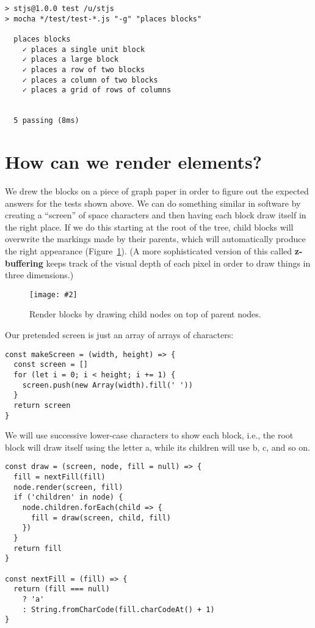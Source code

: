 \documentclass[krantzl]{krantz}
\newcommand{\figpdf}[4]{\begin{figure}%
\centering%
\texttt{[image: \#2]}%
\caption{#3}%
\label{#1}%
\end{figure}}
\newcommand{\figref}[1]{Figure~\ref{#1}}
\newcommand{\glossref}[1]{\textbf{#1}}
\begin{document}
\begin{lstlisting}[frame=tblr,backgroundcolor=\color{black!5}]
> stjs@1.0.0 test /u/stjs
> mocha */test/test-*.js "-g" "places blocks"

  places blocks
    ✓ places a single unit block
    ✓ places a large block
    ✓ places a row of two blocks
    ✓ places a column of two blocks
    ✓ places a grid of rows of columns


  5 passing (8ms)
\end{lstlisting}


\section{How can we render elements?}\label{layout-engine-render}


We drew the blocks on a piece of graph paper
in order to figure out the expected answers for the tests shown above.
We can do something similar in software by creating a “screen” of space characters
and then having each block draw itself in the right place.
If we do this starting at the root of the tree,
child blocks will overwrite the markings made by their parents,
which will automatically produce the right appearance
(\figref{layout-engine-draw-over}).
(A more sophisticated version of this called \glossref{z-buffering}
keeps track of the visual depth of each pixel
in order to draw things in three dimensions.)

\figpdf{layout-engine-draw-over}{./layout-engine/draw-over.pdf}{Render blocks by drawing child nodes on top of parent nodes.}{0.6}


Our pretended screen is just an array of arrays of characters:


\begin{lstlisting}[frame=tblr]
const makeScreen = (width, height) => {
  const screen = []
  for (let i = 0; i < height; i += 1) {
    screen.push(new Array(width).fill(' '))
  }
  return screen
}
\end{lstlisting}



We will use successive lower-case characters to show each block,
i.e.,
the root block will draw itself using the letter a,
while its children will use b, c, and so on.


\begin{lstlisting}[frame=tblr]
const draw = (screen, node, fill = null) => {
  fill = nextFill(fill)
  node.render(screen, fill)
  if ('children' in node) {
    node.children.forEach(child => {
      fill = draw(screen, child, fill)
    })
  }
  return fill
}

const nextFill = (fill) => {
  return (fill === null)
    ? 'a'
    : String.fromCharCode(fill.charCodeAt() + 1)
}
\end{lstlisting}
\end{document}
